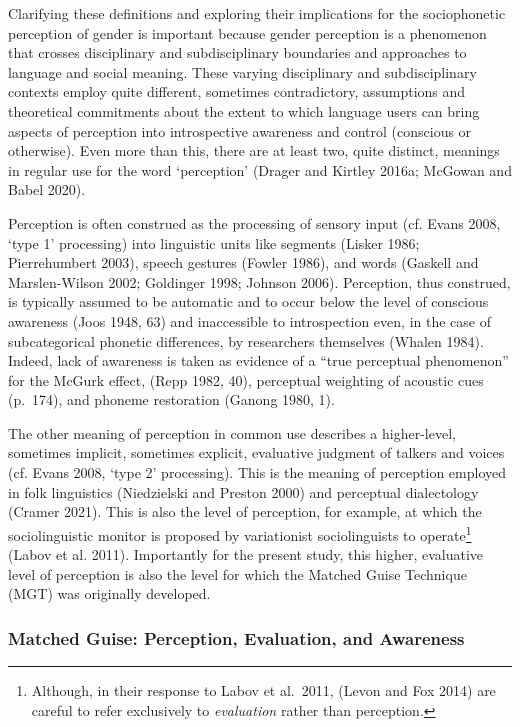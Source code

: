 \documentclass[
  letterpaper,
  DIV=11,
  numbers=noendperiod]{scrartcl}
\begin{document}
Clarifying these definitions and exploring their implications for the
sociophonetic perception of gender is important because gender
perception is a phenomenon that crosses disciplinary and subdisciplinary
boundaries and approaches to language and social meaning. These varying
disciplinary and subdisciplinary contexts employ quite different,
sometimes contradictory, assumptions and theoretical commitments about
the extent to which language users can bring aspects of perception into
introspective awareness and control (conscious or otherwise). Even more
than this, there are at least two, quite distinct, meanings in regular
use for the word `perception' (Drager and Kirtley 2016a; McGowan and
Babel 2020).

Perception is often construed as the processing of sensory input (cf.
Evans 2008, `type 1' processing) into linguistic units like segments
(Lisker 1986; Pierrehumbert 2003), speech gestures (Fowler 1986), and
words (Gaskell and Marslen-Wilson 2002; Goldinger 1998; Johnson 2006).
Perception, thus construed, is typically assumed to be automatic and to
occur below the level of conscious awareness (Joos 1948, 63) and
inaccessible to introspection even, in the case of subcategorical
phonetic differences, by researchers themselves (Whalen 1984). Indeed,
lack of awareness is taken as evidence of a ``true perceptual
phenomenon'' for the McGurk effect, (Repp 1982, 40), perceptual
weighting of acoustic cues (p.~174), and phoneme restoration (Ganong
1980, 1).

The other meaning of perception in common use describes a higher-level,
sometimes implicit, sometimes explicit, evaluative judgment of talkers
and voices (cf. Evans 2008, `type 2' processing). This is the meaning of
perception employed in folk linguistics (Niedzielski and Preston 2000)
and perceptual dialectology (Cramer 2021). This is also the level of
perception, for example, at which the sociolinguistic monitor is
proposed by variationist sociolinguists to operate\footnote{Although, in
  their response to Labov et al.~2011, (Levon and Fox 2014) are careful
  to refer exclusively to \emph{evaluation} rather than perception.}
(Labov et al. 2011). Importantly for the present study, this higher,
evaluative level of perception is also the level for which the Matched
Guise Technique (MGT) was originally developed.

\subsubsection{Matched Guise: Perception, Evaluation, and
Awareness}\label{sec-mgt}
\end{document}
